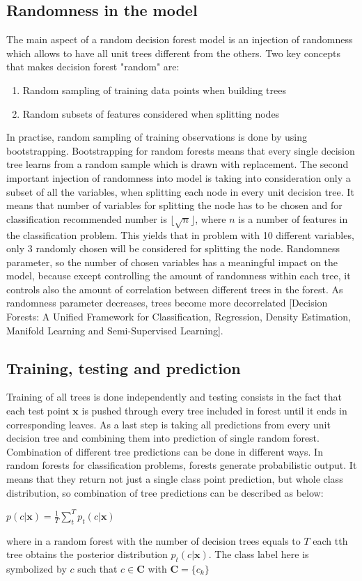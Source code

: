 \subsection{Randomness in the model}
The main aspect of a random decision forest model is an injection of randomness which allows to have all unit trees different from the others. Two key concepts that makes decision forest "random" are:
\begin{enumerate}
\item Random sampling of training data points when building trees
\item Random subsets of features considered when splitting nodes
\end{enumerate}
In practise, random sampling of training observations is done by using bootstrapping. Bootstrapping for random forests means that every single decision tree learns from a random sample which is drawn with replacement. The second important injection of randomness into model is taking into consideration only a subset of all the variables, when splitting each node in every unit decision tree. It means that number of variables for splitting the node has to be chosen and for classification recommended number is $\lfloor{\sqrt{n}} \rfloor$, where $n$ is a number of features in the classification problem. This yields that in problem with 10 different variables, only 3 randomly chosen will be considered for splitting the node. Randomness parameter, so the number of chosen variables has a meaningful impact on the model, because except controlling the amount of randomness within each tree, it controls also the amount of correlation between different trees in the forest. As randomness parameter decreases, trees become more decorrelated [Decision Forests: A Unified Framework for Classification, Regression, Density Estimation, Manifold Learning and Semi-Supervised Learning].
\subsection {Training, testing and prediction}
Training of all trees is done independently and testing consists in the fact that each test point $\textbf{x}$ is pushed through every tree included in forest until it ends in corresponding leaves. As a last step is taking all predictions from every unit decision tree and combining them into prediction of single random forest. Combination of different tree predictions can be done in different ways. In random forests for classification problems, forests generate probabilistic output. It means that they return not just a single class point prediction, but whole class distribution, so combination of tree predictions can be described as below:
\begin{center}
$p(c|\textbf{x}) =  \frac{1}{T} \displaystyle\sum_{t}^{T} p_{t}(c|\textbf{x})$
\end{center}
where in a random forest with the number of decision trees equals to $T$ each tth tree obtains the posterior distribution $ p_{t}(c|\textbf{x})$. The class label here is symbolized by $c$ such that $c \in \textbf{C}$ with $ \textbf{C} = \{ c_{k}\} $

